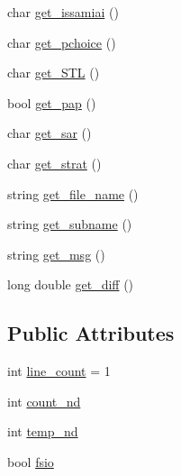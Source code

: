 \begin{DoxyCompactItemize}
\item 
char \mbox{\hyperlink{class_important___values_a8089c172511e40d7d45a8692c6ce4f6d}{get\+\_\+issamiai}} ()
\item 
char \mbox{\hyperlink{class_important___values_afcf3350865b850cfe15a0c0cc7105f14}{get\+\_\+pchoice}} ()
\item 
char \mbox{\hyperlink{class_important___values_aa5c45bac02d2b75175ab647515f8db81}{get\+\_\+\+S\+TL}} ()
\item 
bool \mbox{\hyperlink{class_important___values_ad7195df82d97845f40907758a768293f}{get\+\_\+pap}} ()
\item 
char \mbox{\hyperlink{class_important___values_ab44c0d6647b0a611f8d1bb017cd43635}{get\+\_\+sar}} ()
\item 
char \mbox{\hyperlink{class_important___values_aaddb4a0a6e6804bc316852791271d517}{get\+\_\+strat}} ()
\item 
string \mbox{\hyperlink{class_important___values_a4dc0dcab1cfe7401c5c1ef674cc0e528}{get\+\_\+file\+\_\+name}} ()
\item 
string \mbox{\hyperlink{class_important___values_a2c64f61fe5934d21bb9f86411573957c}{get\+\_\+subname}} ()
\item 
string \mbox{\hyperlink{class_important___values_ade0907e6ded362197bb98df4b5288487}{get\+\_\+msg}} ()
\item 
long double \mbox{\hyperlink{class_important___values_af205a5bef6f9e06c353977bacd806104}{get\+\_\+diff}} ()
\end{DoxyCompactItemize}
\subsection*{Public Attributes}
\begin{DoxyCompactItemize}
\item 
int \mbox{\hyperlink{class_important___values_a5014019ae0958cbc4f4c55ef2455382b}{line\+\_\+count}} = 1
\item 
int \mbox{\hyperlink{class_important___values_a001f02ffe754d8f5f3a0f3829435691b}{count\+\_\+nd}}
\item 
int \mbox{\hyperlink{class_important___values_a4e17c683a365a14fdbc847be3b4e5cb7}{temp\+\_\+nd}}
\item 
bool \mbox{\hyperlink{class_important___values_a25154afce28b5098f79b55c187c9d43c}{fsio}}
\end{DoxyCompactItemize}
